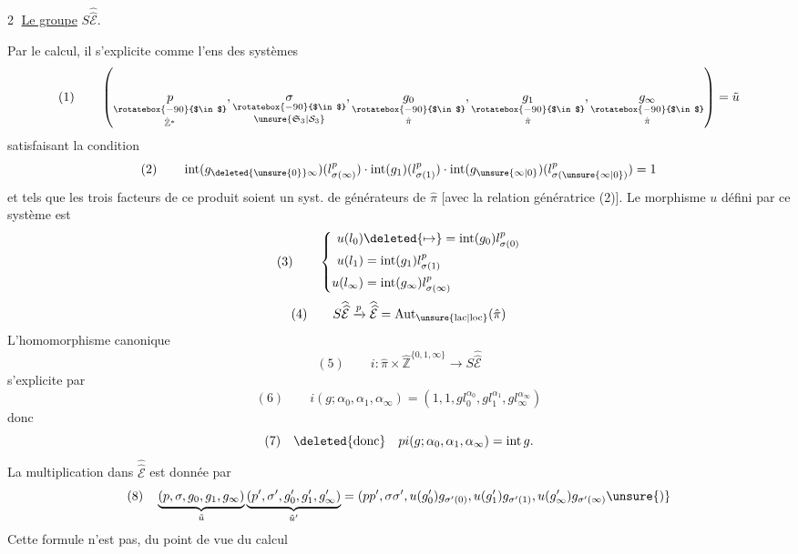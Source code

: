 \textcircled{2} \uline{Le groupe} $S\widehat{\widehat{\mathcal E}}$.

Par le calcul, il s'explicite comme l'ens des systèmes
\[
(1)\qquad\left(\underset{\hat{\mathbb Z}^{*}}{\underset{\rotatebox{-90}{$\in$}}{p}},\underset{\unsure{\mathfrak S_3|\mathcal S_3}}{\underset{\rotatebox{-90}{$\in$}}{\sigma}},\underset{\hat\pi}{\underset{\rotatebox{-90}{$\in$}}{g_0}},\underset{\hat\pi}{\underset{\rotatebox{-90}{$\in$}}{g_1}},\underset{\hat\pi}{\underset{\rotatebox{-90}{$\in$}}{g_\infty}}\right)=\tilde u
\]
satisfaisant la condition
\[
(2)\qquad\operatorname{int}(g_{\deleted{\unsure{0}}\infty})(l_{\sigma(\infty)}^p)\cdot\operatorname{int}(g_1)(l_{\sigma(1)}^p)\cdot\operatorname{int}(g_{\unsure{\infty|0}})(l_{\sigma(\unsure{\infty|0})}^p)=1
\]
et tels que les trois facteurs de ce produit soient un syst. de générateurs de $\hat\pi$ [avec la relation génératrice (2)]. Le morphisme $u$ défini par ce  système est
\[
(3)\qquad\left\{\begin{aligned}
u(l_0)&\deleted{\mapsto}=\operatorname{int}(g_0)l_{\sigma(0)}^p\\
u(l_1)&=\operatorname{int}(g_1)l_{\sigma(1)}^p\\
u(l_\infty)&=\operatorname{int}(g_\infty)l_{\sigma(\infty)}^p
\end{aligned}\right.
\]
\[
(4)\qquad S\widehat{\widehat{\mathcal E}}\xrightarrow{p}\widehat{\widehat{\mathcal E}}=\operatorname{Aut}_{\unsure{\mathrm{lac}|\mathrm{loc}}}(\hat\pi)
\]
L'homomorphisme canonique
\[
(5)\qquad i:\hat\pi\times\hat{\mathbb Z}^{\{0,1,\infty\}}\longrightarrow S\widehat{\widehat{\mathcal E}}
\]
s'explicite par
\[
(6)\qquad i(g;\alpha_0,\alpha_1,\alpha_\infty)=(1,1,gl_0^{\alpha_0},gl_1^{\alpha_1},gl_\infty^{\alpha_\infty})
\]
donc
\[
(7)\quad\deleted{\text{donc}}\quad pi(g;\alpha_0,\alpha_1,\alpha_\infty)=\operatorname{int}g.
\]
La multiplication dans $\widehat{\widehat{\mathcal E}}$ est donnée par
\[
(8)\quad\underbrace{(p,\sigma,g_0,g_1,g_\infty)}_{\tilde u}\underbrace{(p',\sigma',g'_0,g'_1,g'_\infty)}_{\tilde u'}=(pp',\sigma\sigma',u(g'_0)g_{\sigma'(0)},u(g'_1)g_{\sigma'(1)},u(g'_\infty)g_{\sigma'(\infty)}\unsure{)}
\]
Cette formule n'est pas, du point de vue du calcul\unsure{,}
